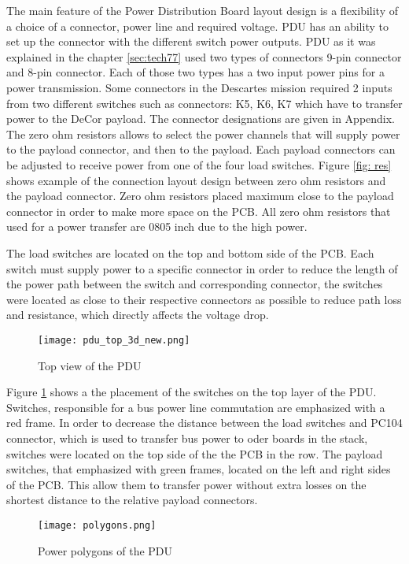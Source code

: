   
The main feature of the Power Distribution Board layout design is a flexibility of a choice of a connector, power line and required voltage. PDU has an ability to set up the connector with the different switch power outputs. PDU as it was explained in the chapter \ref{sec:tech77} used two types of connectors 9-pin connector and 8-pin connector. Each of those two types has a two input power pins for a power transmission.  Some connectors in the Descartes mission required 2 inputs from two different switches such as connectors: K5, K6, K7 which have to transfer power to the DeCor payload. The connector designations are given in Appendix. The zero ohm resistors allows to select the power channels that will supply power to the payload connector, and then to the payload. Each payload connectors can be adjusted to receive power from one of the four load switches. Figure \ref{fig: res} shows example of the connection layout design between zero ohm resistors and the payload connector. Zero ohm resistors placed maximum close to the payload connector in order to make more space on the PCB. All zero ohm resistors that used for a power transfer are 0805 inch due to the high power.

The load switches are located on the top and bottom side of the PCB. Each switch must supply power to a specific connector in order to reduce the length of the power path between the switch and  corresponding connector, the switches were located as close to their respective connectors as possible to reduce path loss and resistance, which directly affects the voltage drop. 

\begin{figure}[h]
	\centering
	\texttt{[image: pdu\_top\_3d\_new.png]}
	\caption{Top view of the PDU}
	\label{fig: toppducon}
\end{figure} 

Figure \ref{fig: toppducon} shows a the placement of the switches on the top layer of the PDU. Switches, responsible for a bus power line commutation are emphasized with a red frame. In order to decrease the distance between the load switches and PC104 connector, which is used to transfer bus power to oder boards in the stack, switches were located on the top side of the the PCB in the row. The payload switches, that emphasized with green frames, located on the left and right sides of the PCB. This allow them to transfer power without extra losses on the shortest distance to the relative payload connectors.

\begin{figure}[h]
	\centering
	\texttt{[image: polygons.png]}
	\caption{Power polygons of the PDU}
	\label{fig: poly}
\end{figure} 

